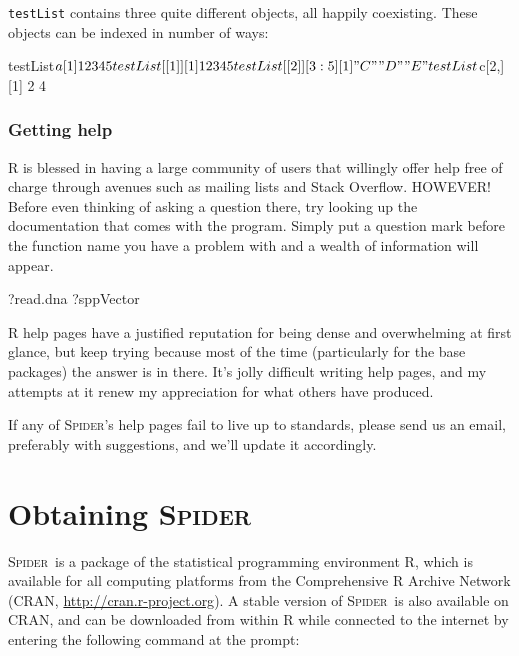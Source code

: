 \documentclass{article}
\newcommand{\spider}{\textsc{Spider}~} %
\newcommand{\Spider}{\textsc{Spider}} %
\newcommand{\progname}[1]{\textsc{#1}}
\newcommand{\fun}[1]{\texttt{#1}}
\begin{document}
\fun{testList} contains three quite different objects, all happily coexisting. These objects can be indexed in number of ways:

\begin{Rio}
testList$a
[1] 1 2 3 4 5
testList[[1]]
[1] 1 2 3 4 5
testList[[2]][3:5]
[1] "C" "D" "E"
testList$c[2,]
[1] 2 4
\end{Rio}




\subsubsection{Getting help}
\progname{R} is blessed in having a large community of users that willingly offer help free of charge through avenues such as mailing lists and Stack Overflow. HOWEVER! Before even thinking of asking a question there, try looking up the documentation that comes with the program. Simply put a question mark before the function name you have a problem with and a wealth of information will appear. 

\begin{console}
?read.dna
?sppVector
\end{console}

\progname{R} help pages have a justified reputation for being dense and overwhelming at first glance, but keep trying because most of the time (particularly for the base packages) the answer is in there. It's jolly difficult writing help pages, and my attempts at it renew my appreciation for what others have produced.

If any of \Spider's help pages fail to live up to standards, please send us an email, preferably with suggestions, and we'll update it accordingly.



\section{Obtaining \spider}
\spider is a package of the statistical programming environment \progname{R}, which is available for all computing platforms from the Comprehensive R Archive Network (CRAN, \href{http://cran.r-project.org}{http://cran.r-project.org}). A stable version of \spider is also available on CRAN, and can be downloaded from within R while connected to the internet by entering the following command at the prompt:
\end{document}
